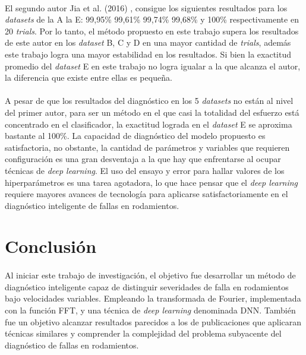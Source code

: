 \documentclass[a4paper,12pt]{article}
\begin{document}
\paragraph{}
El segundo autor Jia et al. (2016) \cite{jia}, consigue los siguientes resultados para los \textit{datasets} de la A la E: 99,95\% 99,61\% 99,74\% 99,68\% y 100\% respectivamente en 20 \textit{trials}. Por lo tanto, el método propuesto en este trabajo supera los resultados de este autor en los \textit{dataset} B, C y D en una mayor cantidad de \textit{trials}, además este trabajo logra una mayor estabilidad en los resultados. Si bien la exactitud promedio del \textit{dataset} E en este trabajo no logra igualar a la que alcanza el autor, la diferencia que existe entre ellas es pequeña.

\paragraph{}
A pesar de que los resultados del diagnóstico en los 5 \textit{datasets} no están al nivel del primer autor, para ser un método en el que casi la totalidad del esfuerzo está concentrado en el clasificador, la exactitud lograda en el \textit{dataset} E se aproxima bastante al 100\%. La capacidad de diagnóstico del modelo propuesto es satisfactoria, no obstante, la cantidad de parámetros y variables que requieren configuración es una gran desventaja a la que hay que enfrentarse al ocupar técnicas de \textit{deep learning}. El uso del ensayo y error para hallar valores de los hiperparámetros es una tarea agotadora, lo que hace pensar que el \textit{deep learning} requiere mayores avances de tecnología para aplicarse satisfactoriamente en el diagnóstico inteligente de fallas en rodamientos.

\section{Conclusión}
\paragraph{}
Al iniciar este trabajo de investigación, el objetivo fue desarrollar un método de diagnóstico inteligente capaz de distinguir severidades de falla en rodamientos bajo velocidades variables. Empleando la transformada de Fourier, implementada con la función FFT, y una técnica de \textit{deep learning} denominada DNN. También fue un objetivo alcanzar resultados parecidos a los de publicaciones que aplicaran técnicas similares y comprender la complejidad del problema subyacente del diagnóstico de fallas en rodamientos.
\end{document}
